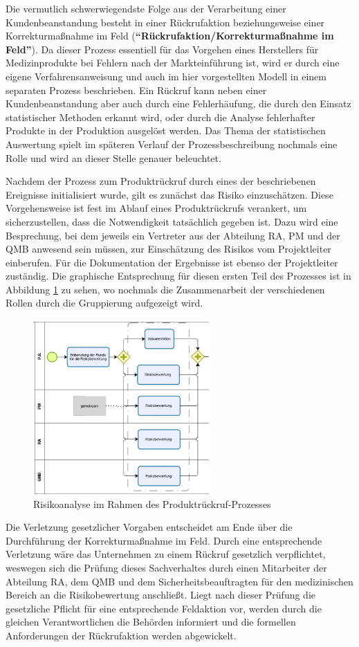 \documentclass[a4paper,12pt]{report}
\begin{document}
Die vermutlich schwerwiegendste Folge aus der Verarbeitung einer Kundenbeanstandung besteht in einer Rückrufaktion beziehungsweise einer Korrekturmaßnahme im Feld (\textbf{"`Rückrufaktion/Korrekturmaßnahme im Feld"'}). Da dieser Prozess essentiell für das Vorgehen eines Herstellers für Medizinprodukte bei Fehlern nach der Markteinführung ist, wird er durch eine eigene Verfahrensanweisung und auch im hier vorgestellten Modell in einem separaten Prozess beschrieben. Ein Rückruf kann neben einer Kundenbeanstandung aber auch durch eine Fehlerhäufung, die durch den Einsatz statistischer Methoden erkannt wird, oder durch die Analyse fehlerhafter Produkte in der Produktion ausgelöst werden. Das Thema der statistischen Auswertung spielt im späteren Verlauf der Prozessbeschreibung nochmals eine Rolle und wird an dieser Stelle genauer beleuchtet. 

Nachdem der Prozess zum Produktrückruf durch eines der beschriebenen Ereignisse initialisiert wurde, gilt es zunächst das Risiko einzuschätzen. Diese Vorgehensweise ist fest im Ablauf eines Produktrückrufs verankert, um sicherzustellen, dass die Notwendigkeit tatsächlich gegeben ist. Dazu wird eine Besprechung, bei dem jeweils ein Vertreter aus der Abteilung RA, PM und der QMB anwesend sein müssen, zur Einschätzung des Risikos vom Projektleiter einberufen. Für die Dokumentation der Ergebnisse ist ebenso der Projektleiter zuständig. Die graphische Entsprechung für diesen ersten Teil des Prozesses ist in Abbildung \ref{capa_risk_analysis} zu sehen, wo nochmals die Zusammenarbeit der verschiedenen Rollen durch die Gruppierung aufgezeigt wird.
\begin{figure}[ht]
\centering
\includegraphics[width=0.6\textwidth]{Images/capa_risk_analysis}
\caption[Risikoanalyse im Rahmen des Produktrückruf-Prozesses]{Risikoanalyse im Rahmen des Produktrückruf-Prozesses}
\label{capa_risk_analysis}
\end{figure}
Die Verletzung gesetzlicher Vorgaben entscheidet am Ende über die Durchführung der Korrekturmaßnahme im Feld. Durch eine entsprechende Verletzung wäre das Unternehmen zu einem Rückruf gesetzlich verpflichtet, weswegen sich die Prüfung dieses Sachverhaltes durch einen Mitarbeiter der Abteilung RA, dem QMB und dem Sicherheitsbeauftragten für den medizinischen Bereich an die Risikobewertung anschließt. Liegt nach dieser Prüfung die gesetzliche Pflicht für eine entsprechende Feldaktion vor, werden durch die gleichen Verantwortlichen die Behörden informiert und die formellen Anforderungen der Rückrufaktion werden abgewickelt.
\end{document}

